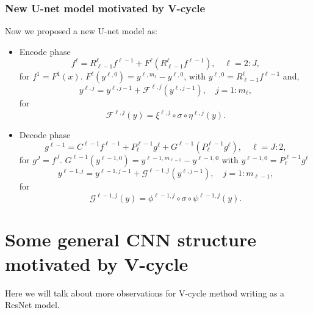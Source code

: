 \subsubsection{New U-net model motivated by V-cycle}
Now we proposed a new U-net model as:
\begin{itemize}
	\item Encode phase
	\begin{equation}\label{U-multi-encode}
	f^{\ell} = R^{\ell}_{\ell -1} f^{\ell-1} + F^{\ell}(R^{\ell}_{\ell -1} f^{\ell-1}), \quad \ell=2:J,
	\end{equation}
	for $f^1 = F^1(x)$. 
	$F^\ell (y^{\ell,0}) = y^{\ell, m_\ell} -  y^{\ell, 0}$, with
	$y^{\ell,0} =R^{\ell}_{\ell-1} f^{\ell-1}$ and, 
	\begin{equation}\label{u-eq:resblock}
	y^{\ell, j} = y^{\ell, j-1} + \mathcal{F}^{\ell, j}(y^{\ell,j-1}),
	\quad j = 1:m_\ell,
	\end{equation}
	for
	\begin{equation}\label{u-eq:basic-f}
	\mathcal{F}^{\ell,j}(y) = \xi^{\ell,j} \circ \sigma \circ \eta^{\ell,j}(y).
	\end{equation}
	
	\item Decode phase
	\begin{equation}\label{U-multi-decode}
	g^{\ell-1} = C^{\ell-1}f^{\ell-1} + P^{\ell-1}_{\ell}g^{\ell} + G^{\ell-1}(P^{\ell-1}_{\ell}g^{\ell}), \quad \ell=J:2,
	\end{equation}
	for $g^{J} = f^J$. 
	$G^{\ell-1} (y^{\ell-1,0}) = y^{\ell-1, m_{\ell-1}} - y^{\ell-1,0}$ with 
	$y^{\ell-1,0} = P^{\ell-1}_{\ell}g^{\ell}$
	\begin{equation}\label{u-eq:rcnnblock}
	y^{\ell-1, j} = y^{\ell-1, j-1} + \mathcal{G}^{\ell-1, j}(y^{\ell,j-1}),
	\quad j = 1:m_{\ell-1},
	\end{equation}
	for
	\begin{equation}\label{u-eq:basic-g}
	\mathcal{G}^{\ell-1,j}(y) = \phi^{\ell-1,j} \circ \sigma \circ \psi^{\ell-1,j}(y).
	\end{equation}
\end{itemize}


\section{Some general CNN structure motivated by V-cycle}
Here we will talk about more observations for V-cycle method writing as a ResNet model.

